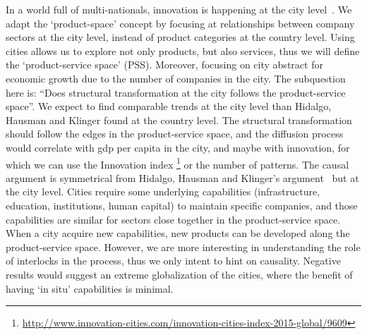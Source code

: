 In a world full of multi-nationals, innovation is happening at the city level~\citep{Belderbos2014}.
We adapt the `product-space' concept by focusing at relationships between company sectors at the city level,
instead of product categories at the country level.
Using cities allows us to explore not only products, but also services, thus we will define the `product-service space' (PSS). 
Moreover, focusing on city abstract for economic growth due to the number of companies in the city.
The subquestion here is: ``Does structural transformation at the city follows the product-service space''.
We expect to find comparable trends at the city level than Hidalgo, Hausman and Klinger found at the country level.
The structural transformation should follow the edges in the product-service space, 
and the diffusion process would correlate with gdp per capita in the city, 
and maybe with innovation, for which we can use the Innovation index \footnote{\url{http://www.innovation-cities.com/innovation-cities-index-2015-global/9609}}
or the number of patterns.
The causal argument is symmetrical from Hidalgo, Hausman and Klinger's argument~\cite{hidalgo2007, hausmann2011, Hausmann2006,hidalgo2009} but at the city level.
Cities require some underlying capabilities (infrastructure, education, institutions, human capital) to maintain specific companies,
and those capabilities are similar for sectors close together in the product-service space.
When a city acquire new capabilities, new products can be developed along the product-service space.
However, we are more interesting in understanding the role of interlocks in the process, 
thus we only intent to hint on causality.
Negative results would suggest an extreme globalization of the cities, 
where the benefit of having `in situ' capabilities is minimal.




